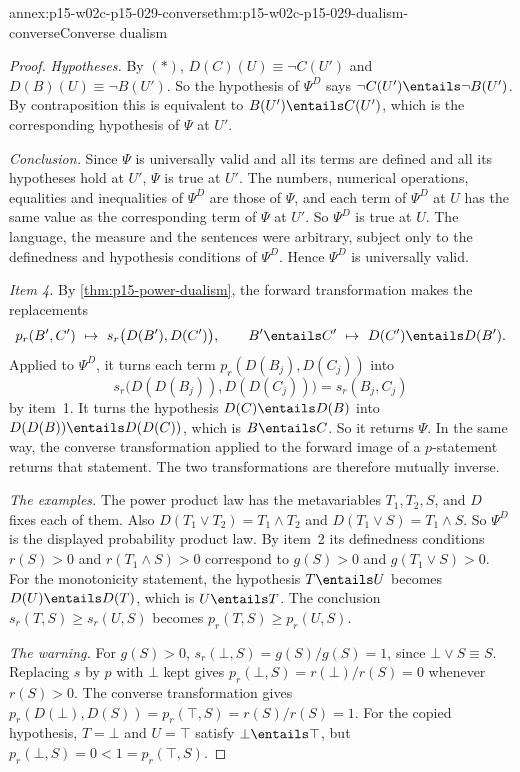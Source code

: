 \begin{annexitem}{annex:p15-w02c-p15-029-converse}{thm:p15-w02c-p15-029-dualism-converse}{Converse dualism}
\begin{proof}
\emph{Hypotheses.} By \((\ast)\), \(D(C)(U)\equiv\neg C(U')\) and
\(D(B)(U)\equiv\neg B(U')\). So the hypothesis of \(\Psi^D\) says
\(\neg C(U')\entails\neg B(U')\). By contraposition this is equivalent
to \(B(U')\entails C(U')\), which is the corresponding hypothesis of
\(\Psi\) at \(U'\).

\emph{Conclusion.} Since \(\Psi\) is universally valid and all its terms
are defined and all its hypotheses hold at \(U'\), \(\Psi\) is true at
\(U'\). The numbers, numerical operations, equalities and inequalities
of \(\Psi^D\) are those of \(\Psi\), and each term of \(\Psi^D\) at \(U\)
has the same value as the corresponding term of \(\Psi\) at \(U'\). So
\(\Psi^D\) is true at \(U\). The language, the measure and the sentences
were arbitrary, subject only to the definedness and hypothesis
conditions of \(\Psi^D\). Hence \(\Psi^D\) is universally valid.

\emph{Item 4.} By \cref{thm:p15-power-dualism}, the forward
transformation makes the replacements
\[
 p_r(B',C')\ \mapsto\ s_r\bigl(D(B'),D(C')\bigr),\qquad
 B'\entails C'\ \mapsto\ D(C')\entails D(B').
\]
Applied to \(\Psi^D\), it turns each
term \(p_r(D(B_j),D(C_j))\) into
\[
 s_r\bigl(D(D(B_j)),D(D(C_j))\bigr)=s_r(B_j,C_j)
\]
by item~1. It turns the hypothesis
\(D(C)\entails D(B)\) into \(D(D(B))\entails D(D(C))\), which is
\(B\entails C\). So it returns \(\Psi\). In the same way, the converse
transformation applied to the forward image of a \(p\)-statement returns
that statement. The two transformations are therefore mutually inverse.

\emph{The examples.} The power product law has the metavariables
\(T_1,T_2,S\), and \(D\) fixes each of them. Also
\(D(T_1\lor T_2)=T_1\land T_2\) and \(D(T_1\lor S)=T_1\land S\). So
\(\Psi^D\) is the displayed probability product law. By item~2 its
definedness conditions \(r(S)>0\) and \(r(T_1\land S)>0\) correspond to
\(g(S)>0\) and \(g(T_1\lor S)>0\). For the monotonicity statement, the
hypothesis \(T\entails U\) becomes \(D(U)\entails D(T)\), which is
\(U\entails T\). The conclusion \(s_r(T,S)\ge s_r(U,S)\) becomes
\(p_r(T,S)\ge p_r(U,S)\).

\emph{The warning.} For \(g(S)>0\), \(s_r(\bot,S)=g(S)/g(S)=1\), since
\(\bot\lor S\equiv S\). Replacing \(s\) by \(p\) with \(\bot\) kept gives
\(p_r(\bot,S)=r(\bot)/r(S)=0\) whenever \(r(S)>0\). The converse
transformation gives \(p_r(D(\bot),D(S))=p_r(\top,S)=r(S)/r(S)=1\). For
the copied hypothesis, \(T=\bot\) and \(U=\top\) satisfy
\(\bot\entails\top\), but \(p_r(\bot,S)=0<1=p_r(\top,S)\).
\end{proof}
\end{annexitem}

